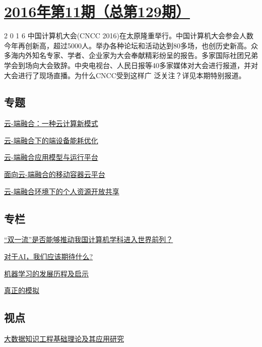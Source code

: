 \documentclass[a4paper]{article}
\begin{document}
\section{\href{http://history.ccf.org.cn/sites/ccf/jsjtbbd.jsp?contentId=2957454485261}{\textbf{2016年第11期（总第129期）}}}
2 0 1 6 中国计算机大会(CNCC 2016)在太原隆重举行。中国计算机大会参会人数今年再创新高，超过5000人。举办各种论坛和活动达到80多场，也创历史新高。众多海内外知名专家、学者、企业家为大会奉献精彩纷呈的报告。多家国际社团兄弟学会到场向大会致辞。中央电视台、人民日报等40多家媒体对大会进行报道，并对大会进行了现场直播。为什么CNCC受到这样广
泛关注？详见本期特别报道。
\subsection{专题}
\href{http://history.ccf.org.cn/resources/1190201776262/2016/11/10/1huanggang.pdf}{云-端融合：一种云计算新模式}

\href{http://history.ccf.org.cn/resources/1190201776262/2016/11/10/caochun.pdf}{云-端融合下的端设备能耗优化}

\href{http://history.ccf.org.cn/resources/1190201776262/2016/11/10/2huanggang.pdf}{云-端融合应用模型与运行平台}

\href{http://history.ccf.org.cn/resources/1190201776262/2016/11/10/wusong.pdf}{面向云-端融合的移动容器云平台}

\href{http://history.ccf.org.cn/resources/1190201776262/2016/11/10/pengxin.pdf}{云-端融合环境下的个人资源开放共享}

\subsection{专栏}
\href{http://history.ccf.org.cn/resources/1190201776262/2016/11/10/YOCSEF.pdf}{“双一流”是否能够推动我国计算机学科进入世界前列？}

\href{http://history.ccf.org.cn/resources/1190201776262/2016/11/10/lihang.pdf}{对于AI，我们应该期待什么?}

\href{http://history.ccf.org.cn/resources/1190201776262/2016/11/10/zhangzhihua.pdf}{机器学习的发展历程及启示}

\href{http://history.ccf.org.cn/resources/1190201776262/2016/11/10/David.pdf}{真正的模拟}

\subsection{视点}
\href{http://history.ccf.org.cn/resources/1190201776262/2016/11/10/Points.pdf}{大数据知识工程基础理论及其应用研究}
\end{document}
